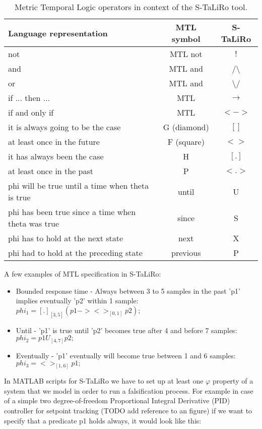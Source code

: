 \begin{table}[htb]
\begin{center}
\begin{tabular}{|p{9cm}|c|c|}
	\hline
	Language representation & MTL symbol & S-TaLiRo\\
	\hline
	not & MTL not & $!$ \\
	\hline	
	and & MTL and & /\textbackslash \\
	\hline
	or & MTL and & \textbackslash/ \\
	\hline
	if ... then ... & MTL &$\rightarrow$ \\
	\hline
	if and only if & MTL & $<->$ \\
	\hline
	it is always going to be the case & G (diamond) & $[ ]$ \\
	\hline
	at least once in the future & F (square) & $< >$ \\
	\hline
	it has always been the case & H & $[ . ]$ \\
	\hline
	at least once in the past & P & $< . >$ \\
	\hline
	phi will be true until a time when theta is true & until & U \\
	\hline
	phi has been true since a time when theta was true & since & S \\
	\hline
	phi has to hold at the next state & next & X \\
	\hline
	phi had to hold at the preceding state & previous & P \\
	\hline
\end{tabular}
\end{center}
\caption{Metric Temporal Logic operators in context of the S-TaLiRo tool.}
\label{tab.MTLsTaLiRo}
\end{table}

A few examples of MTL specification in S-TaLiRo:

\begin{itemize}
	\item Bounded response time - Always between 3 to 5 samples in the past 'p1' implies eventually 'p2' within 1 sample: $phi_1 = [.]_[3,5](p1 -> <>_[0,1] p2);$
	\item Until - 'p1' is true until 'p2' becomes true after 4 and before 7 samples: $phi_2 = p1 U_[4,7] p2;$
	\item Eventually - 'p1' eventually will become true between 1 and 6 samples: $phi_3 = <>_[1,6] p1;$
\end{itemize}

In MATLAB scripts for S-TaLiRo we have to set up at least one $\varphi$ property of a system that we model in order to run a falsification process. For example in case of a simple two degree-of-freedom Proportional Integral Derivative (PID) controller for setpoint tracking (TODO add reference to an figure) if we want to specify that a predicate p1 holds always, it would look like this:


